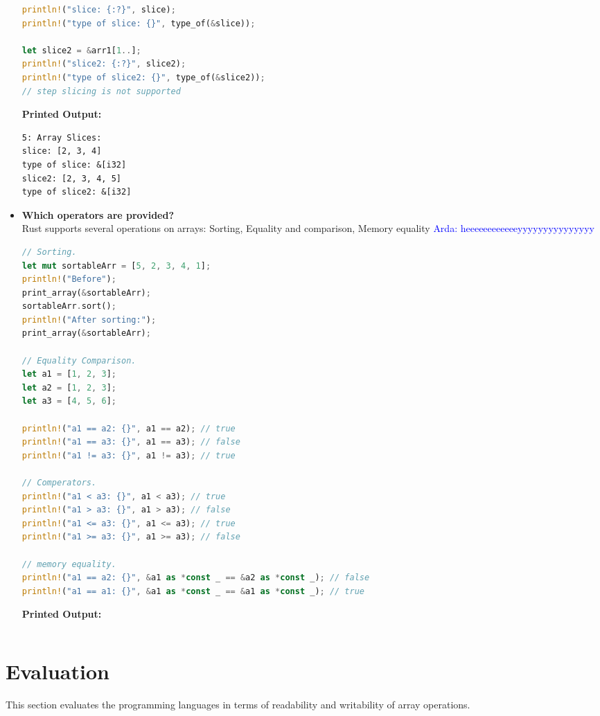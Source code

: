 \documentclass{article}
\newcommand{\arda}[1]{\textcolor{blue}{Arda: #1}}
\begin{document}
\begin{itemize}
\begin{lstlisting}[language=Rust]
println!("slice: {:?}", slice);
println!("type of slice: {}", type_of(&slice));

let slice2 = &arr1[1..];
println!("slice2: {:?}", slice2);
println!("type of slice2: {}", type_of(&slice2));
// step slicing is not supported
\end{lstlisting}
\textbf{Printed Output:}
\begin{verbatim}
5: Array Slices: 
slice: [2, 3, 4]
type of slice: &[i32]
slice2: [2, 3, 4, 5]
type of slice2: &[i32]
\end{verbatim}



\item \textbf{Which operators are provided?} \\
Rust supports several operations on arrays: Sorting, Equality and comparison, Memory equality 
\arda{heeeeeeeeeeeeyyyyyyyyyyyyyyy}
\begin{lstlisting}[language=Rust]
// Sorting.
let mut sortableArr = [5, 2, 3, 4, 1];
println!("Before");
print_array(&sortableArr);
sortableArr.sort();
println!("After sorting:");
print_array(&sortableArr);

// Equality Comparison.
let a1 = [1, 2, 3];
let a2 = [1, 2, 3];
let a3 = [4, 5, 6];

println!("a1 == a2: {}", a1 == a2); // true
println!("a1 == a3: {}", a1 == a3); // false
println!("a1 != a3: {}", a1 != a3); // true

// Comperators.
println!("a1 < a3: {}", a1 < a3); // true
println!("a1 > a3: {}", a1 > a3); // false
println!("a1 <= a3: {}", a1 <= a3); // true
println!("a1 >= a3: {}", a1 >= a3); // false

// memory equality.
println!("a1 == a2: {}", &a1 as *const _ == &a2 as *const _); // false
println!("a1 == a1: {}", &a1 as *const _ == &a1 as *const _); // true
\end{lstlisting}
\textbf{Printed Output:}
\begin{verbatim}

\end{verbatim} 
\end{itemize}
\newpage



\section{Evaluation}

This section evaluates the programming languages in terms of readability and writability of array operations.
\end{document}
